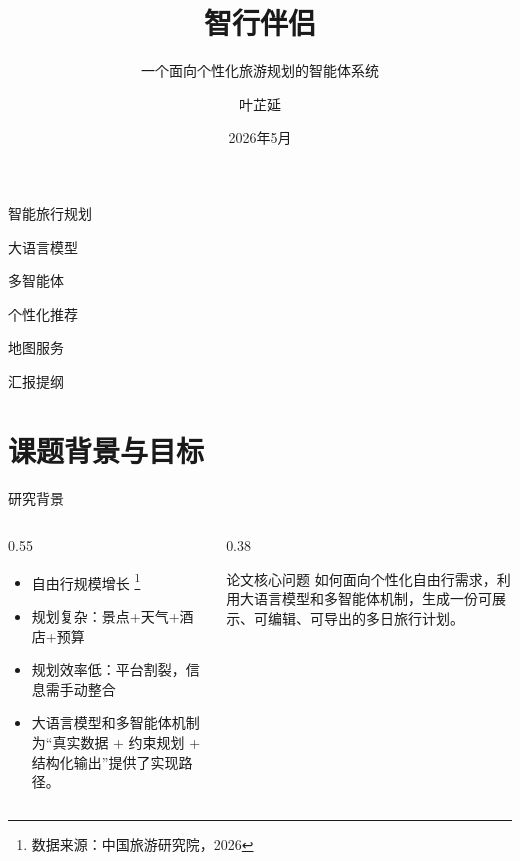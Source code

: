 \documentclass[aspectratio=169]{beamer}
\author{叶芷延}
\title{智行伴侣}
\subtitle{一个面向个性化旅游规划的智能体系统}
\institute{
广州大学 \quad 计算机科学与网络工程学院\newline
计科（创）221\newline
指导教师：肖亚铁
}
\date{2026年5月}
\newcommand{\smalltag}[1]{%
  \colorbox{softpurple}{\strut\hspace{0.55em}\footnotesize #1\hspace{0.55em}}%
}
\begin{document}
\kaishu

\begin{frame}
  \titlepage
  \vspace{-0.8em}
  \begin{center}
    \smalltag{智能旅行规划} \quad
    \smalltag{大语言模型} \quad
    \smalltag{多智能体} \quad
    \smalltag{个性化推荐} \quad
    \smalltag{地图服务}
  \end{center}
\end{frame}

\begin{frame}{汇报提纲}
  \tableofcontents[sectionstyle=show,subsectionstyle=show/shaded/hide]
\end{frame}

\section{课题背景与目标}

\begin{frame}{研究背景}
  \begin{columns}[T]
    \begin{column}{0.55\linewidth}
      \begin{itemize}
        \item 自由行规模增长 \footnote[frame]{数据来源：中国旅游研究院，2026}
        \item 规划复杂：景点+天气+酒店+预算
        \item 规划效率低：平台割裂，信息需手动整合
        \item 大语言模型和多智能体机制为“真实数据 + 约束规划 + 结构化输出”提供了实现路径。
      \end{itemize}
    \end{column}
    \begin{column}{0.38\linewidth}
      \begin{block}{论文核心问题}
        如何面向个性化自由行需求，利用大语言模型和多智能体机制，生成一份可展示、可编辑、可导出的多日旅行计划。
      \end{block}
    \end{column}
  \end{columns}
\end{frame}
\end{document}
